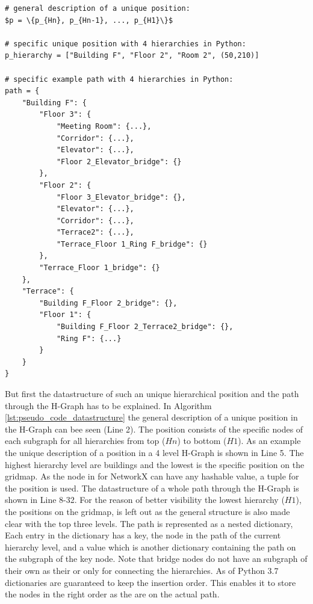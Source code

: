 \begin{lstlisting}[float=h]
# general description of a unique position:
$p = \{p_{Hn}, p_{Hn-1}, ..., p_{H1}\}$

# specific unique position with 4 hierarchies in Python:
p_hierarchy = ["Building F", "Floor 2", "Room 2", (50,210)]

# specific example path with 4 hierarchies in Python:
path = {
    "Building F": {
        "Floor 3": {
            "Meeting Room": {...},
            "Corridor": {...},
            "Elevator": {...},
            "Floor 2_Elevator_bridge": {}
        },
        "Floor 2": {
            "Floor 3_Elevator_bridge": {},
            "Elevator": {...},
            "Corridor": {...},
            "Terrace2": {...},
            "Terrace_Floor 1_Ring F_bridge": {}
        },
        "Terrace_Floor 1_bridge": {}
    },
    "Terrace": {
        "Building F_Floor 2_bridge": {},
        "Floor 1": {
            "Building F_Floor 2_Terrace2_bridge": {},
            "Ring F": {...}
        }
    }
}
\end{lstlisting}

But first the datastructure of such an unique hierarchical position and the path through the H-Graph has to be explained. In Algorithm \ref{lst:pseudo_code_datastructure} the general description of a unique position in the H-Graph can bee seen (Line 2). The position consists of the specific nodes of each subgraph for all hierarchies from top (\(Hn\)) to bottom (\(H1\)). As an example the unique description of a position in a 4 level H-Graph is shown in Line 5. The highest hierarchy level are buildings and the lowest is the specific position on the gridmap. As the node in for NetworkX can have any hashable value, a tuple for the position is used. The datastructure of a whole path through the H-Graph is shown in Line 8-32. For the reason of better visibility the lowest hierarchy (\(H1\)), the positions on the gridmap, is left out as the general structure is also made clear with the top three levels. The path is represented as a nested dictionary, Each entry in the dictionary has a key, the node in the path of the current hierarchy level, and a value which is another dictionary containing the path on the subgraph of the key node. Note that bridge nodes do not have an subgraph of their own as their or only for connecting the hierarchies. As of Python 3.7 dictionaries are guaranteed to keep the insertion order. This enables it to store the nodes in the right order as the are on the actual path. 

